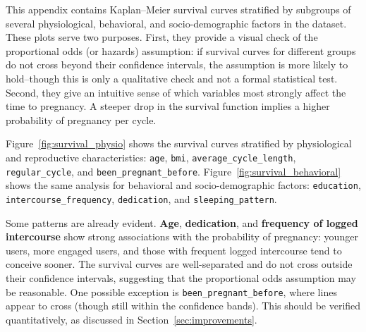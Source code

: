 \documentclass[11pt]{article}
\begin{document}
This appendix contains Kaplan–Meier survival curves stratified by subgroups of several physiological, behavioral, and socio-demographic factors in the dataset. These plots serve two purposes. First, they provide a visual check of the proportional odds (or hazards) assumption: if survival curves for different groups do not cross beyond their confidence intervals, the assumption is more likely to hold--though this is only a qualitative check and not a formal statistical test. Second, they give an intuitive sense of which variables most strongly affect the time to pregnancy. A steeper drop in the survival function implies a higher probability of pregnancy per cycle.

Figure~\ref{fig:survival_physio} shows the survival curves stratified by physiological and reproductive characteristics: \texttt{age}, \texttt{bmi}, \texttt{average\_cycle\_length}, \texttt{regular\_cycle}, and \texttt{been\_pregnant\_before}. Figure~\ref{fig:survival_behavioral} shows the same analysis for behavioral and socio-demographic factors: \texttt{education}, \texttt{intercourse\_frequency}, \texttt{dedication}, and \texttt{sleeping\_pattern}.

Some patterns are already evident. \textbf{Age}, \textbf{dedication}, and \textbf{frequency of logged intercourse} show strong associations with the probability of pregnancy: younger users, more engaged users, and those with frequent logged intercourse tend to conceive sooner. The survival curves are well-separated and do not cross outside their confidence intervals, suggesting that the proportional odds assumption may be reasonable. One possible exception is \texttt{been\_pregnant\_before}, where lines appear to cross (though still within the confidence bands). This should be verified quantitatively, as discussed in Section~\ref{sec:improvements}.

\vspace{0.5cm}
\end{document}
